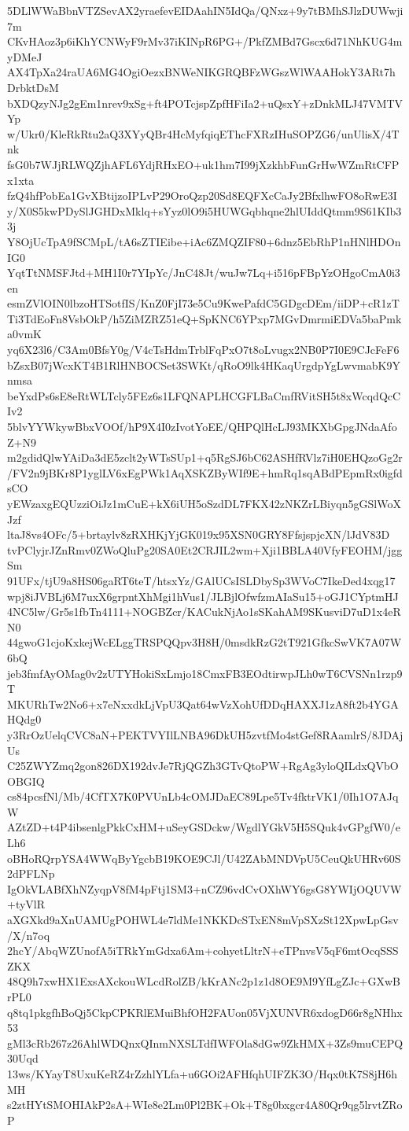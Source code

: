5DLlWWaBbnVTZSevAX2yraefevEIDAahIN5IdQa/QNxz+9y7tBMhSJlzDUWwji7m
CKvHAoz3p6iKhYCNWyF9rMv37iKINpR6PG+/PkfZMBd7Gscx6d71NhKUG4myDMeJ
AX4TpXa24raUA6MG4OgiOezxBNWeNIKGRQBFzWGszWlWAAHokY3ARt7hDrbktDsM
bXDQzyNJg2gEm1nrev9xSg+ft4POTcjspZpfHFiIa2+uQsxY+zDnkMLJ47VMTVYp
w/Ukr0/KleRkRtu2aQ3XYyQBr4HcMyfqiqEThcFXRzIHuSOPZG6/unUlisX/4Tnk
fsG0b7WJjRLWQZjhAFL6YdjRHxEO+uk1hm7I99jXzkhbFunGrHwWZmRtCFPx1xta
fzQ4hfPobEa1GvXBtijzoIPLvP29OroQzp20Sd8EQFXcCaJy2BfxlhwFO8oRwE3I
y/X0S5kwPDySlJGHDxMklq+sYyz0lO9i5HUWGqbhqne2hlUIddQtmm9S61KIb33j
Y8OjUcTpA9fSCMpL/tA6sZTIEibe+iAc6ZMQZIF80+6dnz5EbRhP1nHNlHDOnIG0
YqtTtNMSFJtd+MH1I0r7YIpYc/JnC48Jt/wuJw7Lq+i516pFBpYzOHgoCmA0i3en
esmZVlOIN0lbzoHTSotfIS/KnZ0FjI73e5Cu9KwePafdC5GDgcDEm/iiDP+cR1zT
Ti3TdEoFn8VsbOkP/h5ZiMZRZ51eQ+SpKNC6YPxp7MGvDmrmiEDVa5baPmka0vmK
yq6X23l6/C3Am0BfsY0g/V4cTsHdmTrblFqPxO7t8oLvugx2NB0P7I0E9CJcFeF6
bZsxB07jWcxKT4B1RlHNBOCSet3SWKt/qRoO9lk4HKaqUrgdpYgLwvmabK9Ynmsa
beYxdPs6sE8eRtWLTcly5FEz6s1LFQNAPLHCGFLBaCmfRVitSH5t8xWcqdQcCIv2
5blvYYWkywBbxVOOf/hP9X4I0zIvotYoEE/QHPQlHcLJ93MKXbGpgJNdaAfoZ+N9
m2gdidQlwYAiDa3dE5zclt2yWTsSUp1+q5RgSJ6bC62ASHfRVlz7iH0EHQzoGg2r
/FV2n9jBKr8P1yglLV6xEgPWk1AqXSKZByWIf9E+hmRq1sqABdPEpmRx0igfdsCO
yEWzaxgEQUzziOiJz1mCuE+kX6iUH5oSzdDL7FKX42zNKZrLBiyqn5gGSlWoXJzf
ltaJ8vs4OFc/5+brtaylv8zRXHKjYjGK019x95XSN0GRY8FfsjspjcXN/lJdV83D
tvPClyjrJZnRmv0ZWoQluPg20SA0Et2CRJIL2wm+Xji1BBLA40VfyFEOHM/jggSm
91UFx/tjU9a8HS06gaRT6teT/htsxYz/GAlUCsISLDbySp3WVoC7IkeDed4xqg17
wpj8iJVBLj6M7uxX6grpntXhMgi1hVus1/JLBjlOfwfzmAIaSu15+oGJ1CYptmHJ
4NC5lw/Gr5s1fbTn4111+NOGBZcr/KACukNjAo1sSKahAM9SKusviD7uD1x4eRN0
44gwoG1cjoKxkejWcELggTRSPQQpv3H8H/0msdkRzG2tT921GfkcSwVK7A07W6bQ
jeb3fmfAyOMag0v2zUTYHokiSxLmjo18CmxFB3EOdtirwpJLh0wT6CVSNn1rzp9T
MKURhTw2No6+x7eNxxdkLjVpU3Qat64wVzXohUfDDqHAXXJ1zA8ft2b4YGAHQdg0
y3RrOzUelqCVC8aN+PEKTVYIlLNBA96DkUH5zvtfMo4stGef8RAamlrS/8JDAjUs
C25ZWYZmq2gon826DX192dvJe7RjQGZh3GTvQtoPW+RgAg3yloQILdxQVbOOBGIQ
cs84pcsfNl/Mb/4CfTX7K0PVUnLb4cOMJDaEC89Lpe5Tv4fktrVK1/0Ih1O7AJqW
AZtZD+t4P4ibsenlgPkkCxHM+uSeyGSDckw/WgdlYGkV5H5SQuk4vGPgfW0/eLh6
oBHoRQrpYSA4WWqByYgcbB19KOE9CJl/U42ZAbMNDVpU5CeuQkUHRv60S2dPFLNp
IgOkVLABfXhNZyqpV8fM4pFtj1SM3+nCZ96vdCvOXhWY6gsG8YWIjOQUVW+tyVlR
aXGXkd9aXnUAMUgPOHWL4e7ldMe1NKKDcSTxEN8mVpSXzSt12XpwLpGsv/X/n7oq
2hcY/AbqWZUnofA5iTRkYmGdxa6Am+cohyetLltrN+eTPnvsV5qF6mtOcqSSSZKX
48Q9h7xwHX1ExsAXckouWLcdRolZB/kKrANc2p1z1d8OE9M9YfLgZJc+GXwBrPL0
q8tq1pkgfhBoQj5CkpCPKRlEMuiBhfOH2FAUon05VjXUNVR6xdogD66r8gNHhx53
gMl3cRb267z26AhlWDQnxQInmNXSLTdfIWFOla8dGw9ZkHMX+3Zs9muCEPQ30Uqd
13ws/KYayT8UxuKeRZ4rZzhlYLfa+u6GOi2AFHfqhUIFZK3O/Hqx0tK7S8jH6hMH
s2ztHYtSMOHIAkP2sA+WIe8e2Lm0Pl2BK+Ok+T8g0bxgcr4A80Qr9qg5lrvtZRoP
